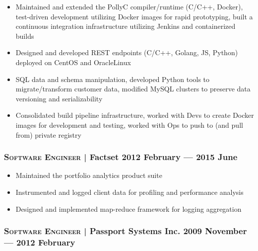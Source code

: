 \documentclass[letterpaper,10pt]{article}
\begin{document}
\begin{itemize}

\item
  Maintained and extended the PollyC compiler/runtime (C/C++, Docker),
  test-driven development utilizing Docker images for rapid prototyping, built
  a continuous integration infrastructure utilizing Jenkins and containerized
  builds
\item
  Designed and developed REST endpoints (C/C++, Golang, JS, Python) deployed on
  CentOS and OracleLinux
\item
  SQL data and schema manipulation, developed Python tools to migrate/transform
  customer data, modified MySQL clusters to preserve data versioning and
  serializability
\item
  Consolidated build pipeline infrastructure, worked with Devs to create Docker
  images for development and testing, worked with Ops to push to (and pull
  from) private registry

\end{itemize}



\subsubsection*{\textsc{Software Engineer} | Factset \hfill 2012 February --- 2015 June}

\begin{itemize}

\item
  Maintained the portfolio analytics product suite
\item
  Instrumented and logged client data for profiling and performance analysis
\item
  Designed and implemented map-reduce framework for logging aggregation

\end{itemize}


\subsubsection*{\textsc{Software Engineer} | Passport Systems Inc. \hfill 2009 November --- 2012 February}
\end{document}
